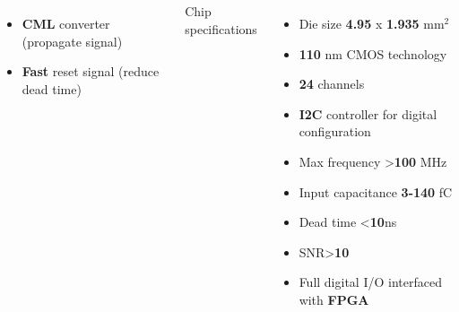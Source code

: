 \documentclass[aspectratio=169]{beamer}
\begin{document}
\begin{frame}
\begin{columns}
\begin{columns}
{\begin{itemize}
\begin{itemize}
{				}
				\end{itemize}
				\item \textbf{CML} converter (propagate signal)
				\item \textbf{Fast} reset signal (reduce dead time)
			\end{itemize} }
			{\color{blue} Chip specifications }
			\begin{itemize}
				\item Die size \textbf{4.95 }x \textbf{1.935} mm$^2$
				\item \textbf{110} nm CMOS technology
				\item \textbf{24} channels
				\item \textbf{I2C} controller for digital configuration
				\item Max frequency >\textbf{100} MHz
				\item Input capacitance \textbf{3-140} fC
				\item Dead time <\textbf{10}ns
				\item SNR>\textbf{10}
				\item Full digital I/O interfaced \\ with \textbf{FPGA}
			\end{itemize}
		\end{columns}
	\end{columns}
	\end{frame}

		
\end{document}
